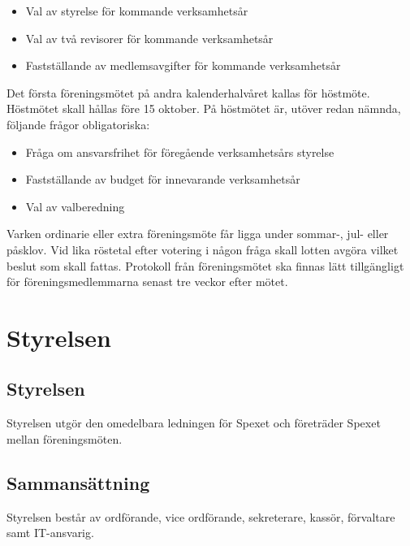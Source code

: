 \documentclass[a4paper]{article}
\begin{document}
\begin{itemize}
  \item Val av styrelse för kommande verksamhetsår
  \item Val av två revisorer för kommande verksamhetsår
  \item Fastställande av medlemsavgifter för kommande verksamhetsår
\end{itemize}

\noindent
Det första föreningsmötet på andra kalenderhalvåret kallas för höstmöte. Höstmötet skall hållas före 15 oktober.\newline
\newline
På höstmötet är, utöver redan nämnda, följande frågor obligatoriska:

\begin{itemize}
  \item Fråga om ansvarsfrihet för föregående verksamhetsårs styrelse
  \item Fastställande av budget för innevarande verksamhetsår
  \item Val av valberedning
\end{itemize}

\noindent
Varken ordinarie eller extra föreningsmöte får ligga under sommar-, jul- eller påsklov.\newline
\newline
Vid lika röstetal efter votering i någon fråga skall lotten avgöra vilket beslut som skall fattas.\newline
\newline
Protokoll från föreningsmötet ska finnas lätt tillgängligt för föreningsmedlemmarna senast tre veckor efter mötet.

\section{Styrelsen}
\label{section:styrelsen}

\subsection{Styrelsen}
Styrelsen utgör den omedelbara ledningen för Spexet och företräder Spexet mellan föreningsmöten.

\subsection{Sammansättning}
Styrelsen består av ordförande, vice ordförande, sekreterare, kassör, förvaltare samt IT-ansvarig.
\end{document}
